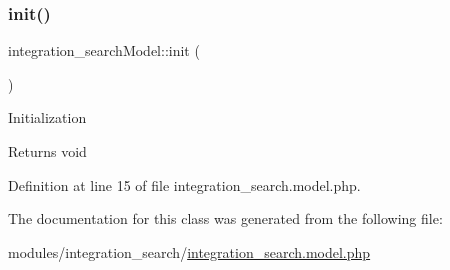 \mbox{\label{classintegration__searchModel_a77ba2cc52ea9843a6812274785a9393f}} 
\subsubsection{\texorpdfstring{init()}{init()}}
{\footnotesize\ttfamily integration\+\_\+search\+Model\+::init (\begin{DoxyParamCaption}{ }\end{DoxyParamCaption})}

Initialization

\begin{DoxyReturn}{Returns}
void 
\end{DoxyReturn}


Definition at line 15 of file integration\+\_\+search.\+model.\+php.



The documentation for this class was generated from the following file\+:\begin{DoxyCompactItemize}
\item 
modules/integration\+\_\+search/\hyperlink{integration__search_8model_8php}{integration\+\_\+search.\+model.\+php}\end{DoxyCompactItemize}
